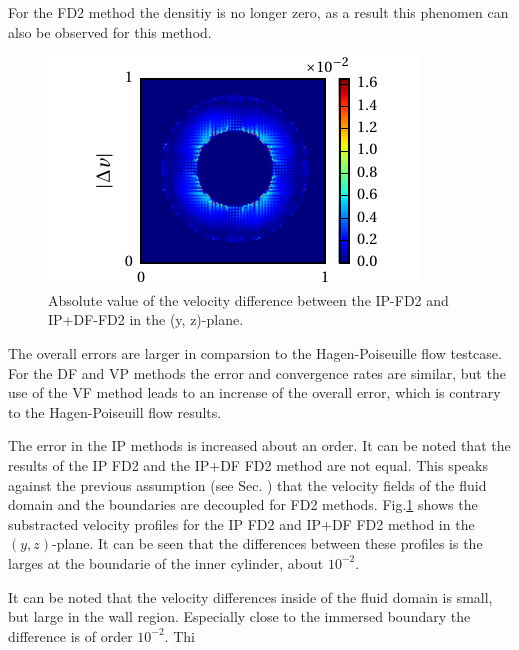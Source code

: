 For the FD2 method the densitiy is no longer zero, as a result this phenomen can also be observed for this method.

\begin{figure}[!bp]
  \begin{minipage}[c]{0.4\textwidth}
      \centering
      \includegraphics{gfx/immersed_boundary/tcflow/discussion/vzdiff.pdf}
  \end{minipage}
  \begin{minipage}[c]{0.6\textwidth}
      \caption{Absolute value of the velocity difference between the IP-FD2 and IP+DF-FD2 in the (y, z)-plane.
      \label{valid:hpflow_velodiff_discussion}
      }
  \end{minipage}
\end{figure}

The overall errors are larger in comparsion to the Hagen-Poiseuille flow testcase.
For the DF and VP methods the error and convergence rates are similar, but the
use of the VF method leads to an increase of the overall error, which is contrary to the Hagen-Poiseuill flow results.

The error in the IP methods is increased about an order.
It can be noted that the results of the IP FD2 and the IP+DF FD2 method are not equal.
This speaks against the previous assumption (see Sec. ) that the velocity fields of
the fluid domain and the boundaries are decoupled for FD2 methods.
Fig.\ref{valid:hpflow_velodiff_discussion} shows the substracted velocity profiles for the IP FD2 and IP+DF FD2 method in the $(y, z)$-plane.
It can be seen that the differences between these profiles is the larges at the boundarie of the inner cylinder, about $10^{-2}$.


It can be noted that the velocity differences inside of the fluid domain is small, but large in the wall region.
Especially close to the immersed boundary the difference  is of order $10^{-2}$.
Thi

